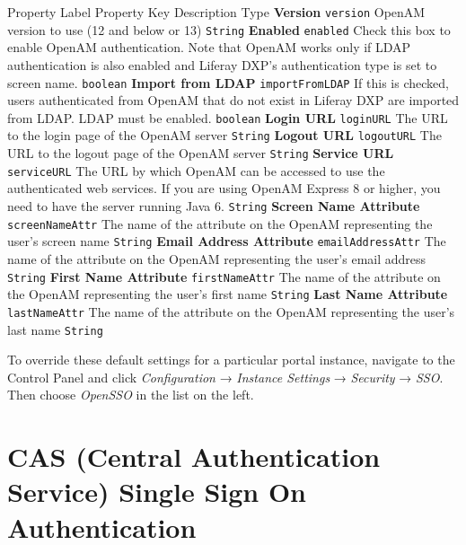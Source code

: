 Property Label \textbar{} Property Key \textbar{} Description \textbar{}
Type \textbf{Version} \textbar{} \texttt{version} \textbar{} OpenAM
version to use (12 and below or 13) \textbar{} \texttt{String}
\textbf{Enabled} \textbar{} \texttt{enabled} \textbar{} Check this box
to enable OpenAM authentication. Note that OpenAM works only if LDAP
authentication is also enabled and Liferay DXP's authentication type is
set to screen name. \textbar{} \texttt{boolean} \textbf{Import from
LDAP} \textbar{} \texttt{importFromLDAP} \textbar{} If this is checked,
users authenticated from OpenAM that do not exist in Liferay DXP are
imported from LDAP. LDAP must be enabled. \textbar{} \texttt{boolean}
\textbf{Login URL} \textbar{} \texttt{loginURL} \textbar{} The URL to
the login page of the OpenAM server \textbar{} \texttt{String}
\textbf{Logout URL} \textbar{} \texttt{logoutURL} \textbar{} The URL to
the logout page of the OpenAM server \textbar{} \texttt{String}
\textbf{Service URL} \textbar{} \texttt{serviceURL} \textbar{} The URL
by which OpenAM can be accessed to use the authenticated web services.
If you are using OpenAM Express 8 or higher, you need to have the server
running Java 6. \textbar{} \texttt{String} \textbf{Screen Name
Attribute} \textbar{} \texttt{screenNameAttr} \textbar{} The name of the
attribute on the OpenAM representing the user's screen name \textbar{}
\texttt{String} \textbf{Email Address Attribute} \textbar{}
\texttt{emailAddressAttr} \textbar{} The name of the attribute on the
OpenAM representing the user's email address \textbar{} \texttt{String}
\textbf{First Name Attribute} \textbar{} \texttt{firstNameAttr}
\textbar{} The name of the attribute on the OpenAM representing the
user's first name \textbar{} \texttt{String} \textbf{Last Name
Attribute} \textbar{} \texttt{lastNameAttr} \textbar{} The name of the
attribute on the OpenAM representing the user's last name \textbar{}
\texttt{String}

To override these default settings for a particular portal instance,
navigate to the Control Panel and click \emph{Configuration} →
\emph{Instance Settings} → \emph{Security} → \emph{SSO}. Then choose
\emph{OpenSSO} in the list on the left.

\chapter{CAS (Central Authentication Service) Single Sign On
Authentication}\label{cas-central-authentication-service-single-sign-on-authentication}

